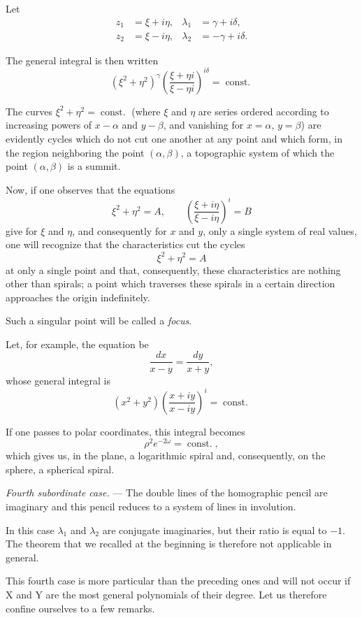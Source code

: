\documentclass[11pt]{article}
\begin{document}
Let
\[
\begin{aligned}
z_1&=\xi+i\eta,& \lambda_1&=\gamma+i\delta,\\
z_2&=\xi-i\eta,& \lambda_2&=-\gamma+i\delta.
\end{aligned}
\]

The general integral is then written
\[
(\xi^2+\eta^2)^\gamma\left(\frac{\xi+\eta i}{\xi-\eta i}\right)^{i\delta}=\operatorname{const.}
\]

The curves $\xi^2+\eta^2=\operatorname{const.}$ (where $\xi$ and $\eta$ are series ordered according to increasing powers of $x-\alpha$ and $y-\beta$, and vanishing for $x=\alpha$, $y=\beta$) are evidently cycles which do not cut one another at any point and which form, in the region neighboring the point $(\alpha,\beta)$, a topographic system of which the point $(\alpha,\beta)$ is a summit.

Now, if one observes that the equations
\[
\xi^2+\eta^2=A,
\qquad
\left(\frac{\xi+i\eta}{\xi-i\eta}\right)^i=B
\]
give for $\xi$ and $\eta$, and consequently for $x$ and $y$, only a single system of real values, one will recognize that the characteristics cut the cycles
\[
\xi^2+\eta^2=A
\]
at only a single point and that, consequently, these characteristics are nothing other than spirals; a point which traverses these spirals in a certain direction approaches the origin indefinitely.

Such a singular point will be called a \emph{focus}.

Let, for example, the equation be
\[
\frac{dx}{x-y}=\frac{dy}{x+y},
\]
whose general integral is
\[
(x^2+y^2)\left(\frac{x+iy}{x-iy}\right)^i=\operatorname{const.}
\]

If one passes to polar coordinates, this integral becomes
\[
\rho^2e^{-2\omega}=\operatorname{const.},
\]
which gives us, in the plane, a logarithmic spiral and, consequently, on the sphere, a spherical spiral.

\emph{Fourth subordinate case.} --- The double lines of the homographic pencil are imaginary and this pencil reduces to a system of lines in involution.

In this case $\lambda_1$ and $\lambda_2$ are conjugate imaginaries, but their ratio is equal to $-1$. The theorem that we recalled at the beginning is therefore not applicable in general.

This fourth case is more particular than the preceding ones and will not occur if X and Y are the most general polynomials of their degree. Let us therefore confine ourselves to a few remarks.
\end{document}
